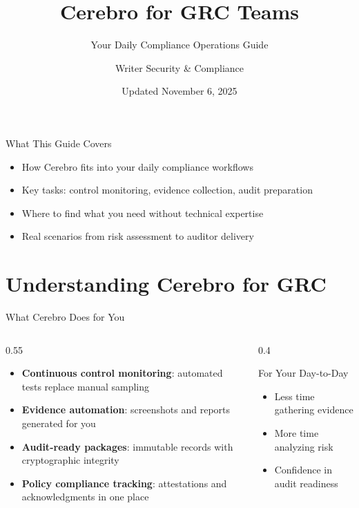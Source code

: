 \documentclass[aspectratio=169]{beamer}
\title{Cerebro for GRC Teams}
\subtitle{Your Daily Compliance Operations Guide}
\author{Writer Security \& Compliance}
\date{Updated November 6, 2025}
\begin{document}
\begin{frame}
  \titlepage
\end{frame}

\begin{frame}{What This Guide Covers}
  \begin{itemize}
    \item How Cerebro fits into your daily compliance workflows
    \item Key tasks: control monitoring, evidence collection, audit preparation
    \item Where to find what you need without technical expertise
    \item Real scenarios from risk assessment to auditor delivery
  \end{itemize}
\end{frame}

\section{Understanding Cerebro for GRC}

\begin{frame}{What Cerebro Does for You}
  \begin{columns}
    \begin{column}{0.55\textwidth}
      \begin{itemize}
        \item \textbf{Continuous control monitoring}: automated tests replace manual sampling
        \item \textbf{Evidence automation}: screenshots and reports generated for you
        \item \textbf{Audit-ready packages}: immutable records with cryptographic integrity
        \item \textbf{Policy compliance tracking}: attestations and acknowledgments in one place
      \end{itemize}
    \end{column}
    \begin{column}{0.4\textwidth}
      \begin{block}{For Your Day-to-Day}
        \begin{itemize}
          \item Less time gathering evidence
          \item More time analyzing risk
          \item Confidence in audit readiness
        \end{itemize}
      \end{block}
    \end{column}
  \end{columns}
\end{frame}
\end{document}
